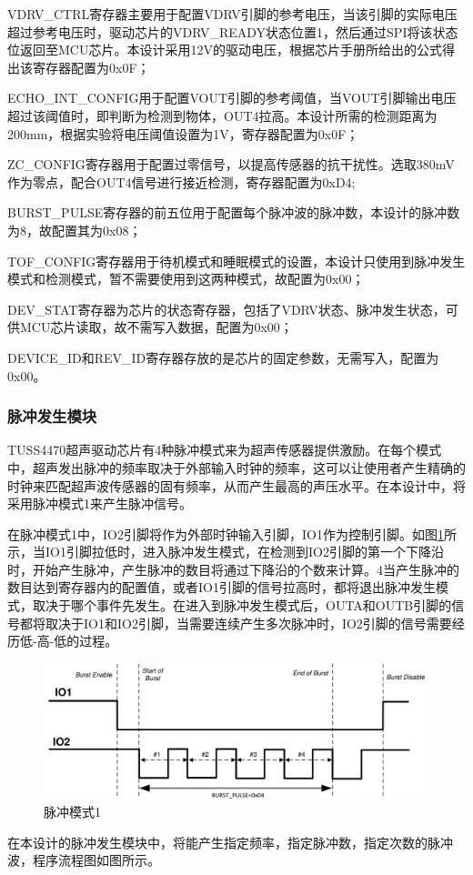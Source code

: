     VDRV\_CTRL寄存器主要用于配置VDRV引脚的参考电压，当该引脚的实际电压超过参考电压时，驱动芯片的VDRV\_READY状态位置1，然后通过SPI将该状态位返回至MCU芯片。本设计采用12V的驱动电压，根据芯片手册所给出的公式得出该寄存器配置为0x0F；\par
    ECHO\_INT\_CONFIG用于配置VOUT引脚的参考阈值，当VOUT引脚输出电压超过该阈值时，即判断为检测到物体，OUT4拉高。本设计所需的检测距离为200mm，根据实验将电压阈值设置为1V，寄存器配置为0x0F；\par
    ZC\_CONFIG寄存器用于配置过零信号，以提高传感器的抗干扰性。选取380mV作为零点，配合OUT4信号进行接近检测，寄存器配置为0xD4;\par
    BURST\_PULSE寄存器的前五位用于配置每个脉冲波的脉冲数，本设计的脉冲数为8，故配置其为0x08；\par
    TOF\_CONFIG寄存器用于待机模式和睡眠模式的设置，本设计只使用到脉冲发生模式和检测模式，暂不需要使用到这两种模式，故配置为0x00；\par
    DEV\_STAT寄存器为芯片的状态寄存器，包括了VDRV状态、脉冲发生状态，可供MCU芯片读取，故不需写入数据，配置为0x00；\par
    DEVICE\_ID和REV\_ID寄存器存放的是芯片的固定参数，无需写入，配置为0x00。
    
    \subsubsection{脉冲发生模块}
    TUSS4470超声驱动芯片有4种脉冲模式来为超声传感器提供激励。在每个模式中，超声发出脉冲的频率取决于外部输入时钟的频率，这可以让使用者产生精确的时钟来匹配超声波传感器的固有频率，从而产生最高的声压水平。在本设计中，将采用脉冲模式1来产生脉冲信号。\par
    在脉冲模式1中，IO2引脚将作为外部时钟输入引脚，IO1作为控制引脚。如图\ref{脉冲模式1}所示，当IO1引脚拉低时，进入脉冲发生模式，在检测到IO2引脚的第一个下降沿时，开始产生脉冲，产生脉冲的数目将通过下降沿的个数来计算。4当产生脉冲的数目达到寄存器内的配置值，或者IO1引脚的信号拉高时，都将退出脉冲发生模式，取决于哪个事件先发生。在进入到脉冲发生模式后，OUTA和OUTB引脚的信号都将取决于IO1和IO2引脚，当需要连续产生多次脉冲时，IO2引脚的信号需要经历低-高-低的过程。
     \begin{figure}[H]
        \centering
        \includegraphics[width=12cm]{figure/IO MODE1.png}
        \songti{}\caption{脉冲模式1}
        \label{脉冲模式1}
    \end{figure}
    在本设计的脉冲发生模块中，将能产生指定频率，指定脉冲数，指定次数的脉冲波，程序流程图如图所示。
    
